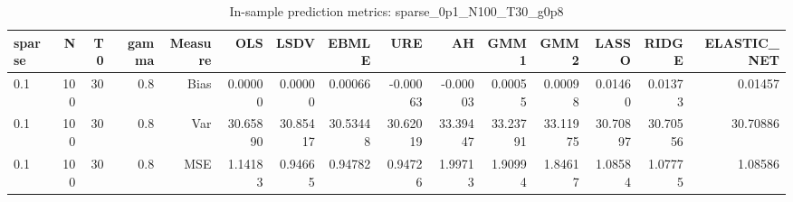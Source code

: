 \begin{table}[!htbp]\centering
\caption{In-sample prediction metrics: sparse_0p1_N100_T30_g0p8}
\label{tab:table2_sparse_0p1_N100_T30_g0p8}
\begin{tabular}{lrrrrrrrrrrrrrr}
\hline
sparse & N & T0 & gamma & Measure & OLS & LSDV & EBMLE & URE & AH & GMM1 & GMM2 & LASSO & RIDGE & ELASTIC_NET \\
\hline
0.1 & 100 & 30 & 0.8 & Bias & 0.00000 & 0.00000 & 0.00066 & -0.00063 & -0.00003 & 0.00055 & 0.00098 & 0.01460 & 0.01373 & 0.01457 \\
0.1 & 100 & 30 & 0.8 & Var & 30.65890 & 30.85417 & 30.53448 & 30.62019 & 33.39447 & 33.23791 & 33.11975 & 30.70897 & 30.70556 & 30.70886 \\
0.1 & 100 & 30 & 0.8 & MSE & 1.14183 & 0.94665 & 0.94782 & 0.94726 & 1.99713 & 1.90994 & 1.84617 & 1.08584 & 1.07775 & 1.08586 \\
\hline
\end{tabular}
\end{table}


